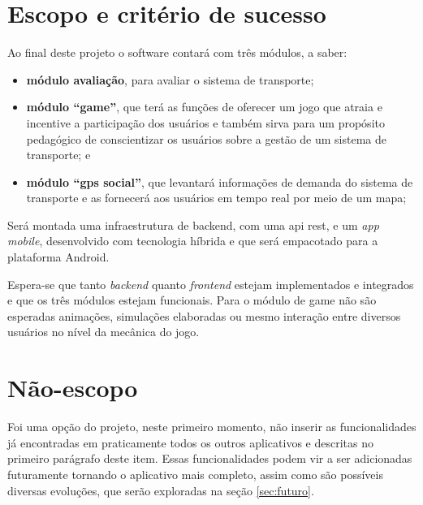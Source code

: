 \section{Escopo e critério de sucesso}\label{sec:Escopo}
	Ao final deste projeto o software contará com três módulos, a saber:
	\begin{itemize}%
		\item \textbf{módulo avaliação}, para avaliar o sistema de transporte;
		\item \textbf{módulo ``game''}, que terá as funções de oferecer um jogo que atraia e incentive a participação dos usuários e também sirva para um propósito pedagógico de conscientizar os usuários sobre a gestão de um sistema de transporte; e
		\item \textbf{módulo ``gps social''}, que levantará informações de demanda do sistema de transporte e as fornecerá aos usuários em tempo real por meio de um mapa;
	\end{itemize}
Será montada uma infraestrutura de backend, com uma \gls{api} \gls{rest}, e um \textit{app mobile}, desenvolvido com tecnologia híbrida e que será empacotado para a plataforma Android.

Espera-se que tanto \textit{backend} quanto \textit{frontend} estejam implementados e integrados e que os três módulos estejam funcionais. Para o módulo de game não são esperadas animações, simulações elaboradas ou mesmo interação entre diversos usuários no nível da mecânica do jogo.

\section{Não-escopo}\label{sec:NãoEscopo}
Foi uma opção do projeto, neste primeiro momento, não inserir as funcionalidades já encontradas em praticamente todos os outros aplicativos e descritas no primeiro parágrafo deste item. Essas funcionalidades podem vir a ser adicionadas futuramente tornando o aplicativo mais completo, assim como são possíveis diversas evoluções, que serão exploradas na seção \ref{sec:futuro}.


